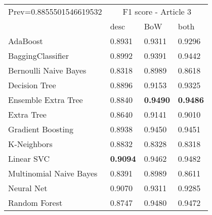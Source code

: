 \begin{tabular}{|l|l|l|l| }
\hline
Prev=0.8855501546619532 &  \multicolumn{3}{c|}{F1 score - Article 3} \\
\cline{2-4} & desc & BoW & both \\ \hline
AdaBoost                & 0.8931 & 0.9311 & 0.9296\\
BaggingClassifier       & 0.8992 & 0.9391 & 0.9442\\
Bernoulli Naive Bayes   & 0.8318 & 0.8989 & 0.8618\\
Decision Tree           & 0.8896 & 0.9153 & 0.9325\\
Ensemble Extra Tree     & 0.8840 & {\bf 0.9490} & {\bf 0.9486}\\
Extra Tree              & 0.8640 & 0.9141 & 0.9010\\
Gradient Boosting       & 0.8938 & 0.9450 & 0.9451\\
K-Neighbors             & 0.8832 & 0.8328 & 0.8318\\
Linear SVC              & {\bf 0.9094} & 0.9462 & 0.9482\\
Multinomial Naive Bayes & 0.8391 & 0.8989 & 0.8611\\
Neural Net              & 0.9070 & 0.9311 & 0.9285\\
Random Forest           & 0.8747 & 0.9480 & 0.9472\\
\hline
\end{tabular}